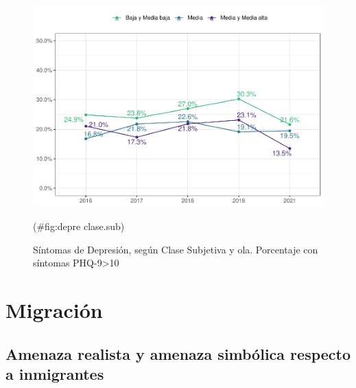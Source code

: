 \documentclass[
  12pt,
  openany]{book}
\begin{document}
\begin{figure}

{\centering \includegraphics{reporte-elsoc_files/figure-latex/depre clase.sub-1} 

}

\caption{Síntomas de Depresión, según Clase Subjetiva y ola. Porcentaje con síntomas PHQ-9>10}(\#fig:depre clase.sub)
\end{figure}

\hypertarget{migraciuxf3n}{%
\chapter{Migración}\label{migraciuxf3n}}

\hypertarget{amenaza-realista-y-amenaza-simbuxf3lica-respecto-a-inmigrantes}{%
\section{Amenaza realista y amenaza simbólica respecto a inmigrantes}\label{amenaza-realista-y-amenaza-simbuxf3lica-respecto-a-inmigrantes}}
\end{document}
